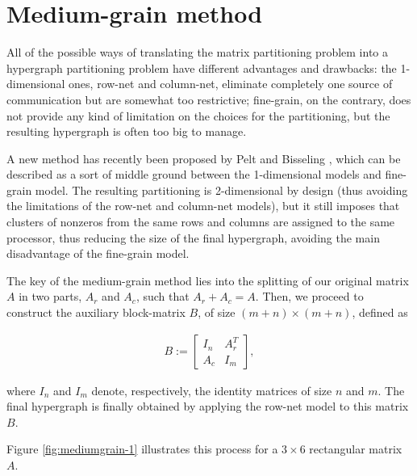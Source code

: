 \section{Medium-grain method} \label{sec:mediumgrain}

All of the possible ways of translating the matrix partitioning problem into a hypergraph partitioning problem have different advantages and drawbacks: the 1-dimensional ones, row-net and column-net, eliminate completely one source of communication but are somewhat too restrictive; fine-grain, on the contrary, does not provide any kind of limitation on the choices for the partitioning, but the resulting hypergraph is often too big to manage.

A new method has recently been proposed by Pelt and Bisseling \cite{mediumgrain}, which can be described as a sort of middle ground between the 1-dimensional models and fine-grain model. The resulting partitioning is 2-dimensional by design (thus avoiding the limitations of the row-net and column-net models), but it still imposes that clusters of nonzeros from the same rows and columns are assigned to the same processor, thus reducing the size of the final hypergraph, avoiding the main disadvantage of the fine-grain model.

The key of the medium-grain method lies into the splitting of our original matrix $A$ in two parts, $A_r$ and $A_c$, such that $A_r + A_c = A$. Then, we proceed to construct the auxiliary block-matrix $B$, of size $(m+n) \times (m+n)$, defined as

\begin{align}
	B:=	\begin{bmatrix}
		I_n & A_r^T \\
		A_c & I_m
	\end{bmatrix},
	\label{eq:Bmatrix}
\end{align}

where $I_n$ and $I_m$ denote, respectively, the identity matrices of size $n$ and $m$. The final hypergraph is finally obtained by applying the row-net model to this matrix $B$. 

Figure \ref{fig:mediumgrain-1} illustrates this process for a $3 \times 6$ rectangular matrix $A$.

